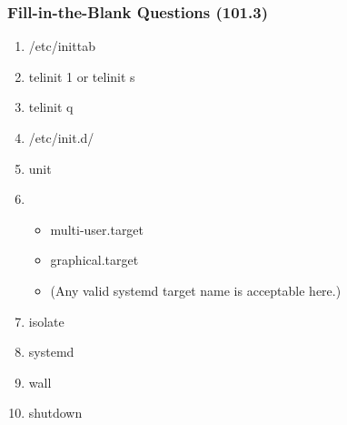 \documentclass[12pt,a4paper]{report}
\begin{document}
\subsubsection*{Fill-in-the-Blank Questions (101.3)}
    \begin{enumerate}[1.]
    \item /etc/inittab
    \item telinit 1 or telinit s
    \item telinit q
    \item /etc/init.d/
    \item unit
    \item 
        \begin{itemize}
            \item multi-user.target
            \item graphical.target
            \item (Any valid systemd target name is acceptable here.)
        \end{itemize}
    \item isolate
    \item systemd
    \item wall
    \item shutdown
    \end{enumerate}
\end{document}
